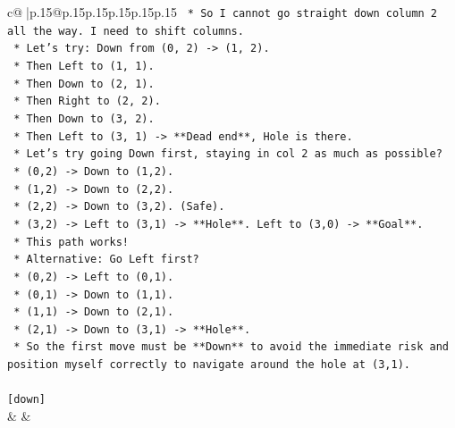 \documentclass{article}
\begin{document}
{\begin{supertabular}{c@{$\;$}|p{.15\linewidth}@{}p{.15\linewidth}p{.15\linewidth}p{.15\linewidth}p{.15\linewidth}p{.15\linewidth}}
{{{\texttt{    *   So I cannot go straight down column 2 all the way. I need to shift columns.} \\
\texttt{    *   Let's try: Down from (0, 2) {-}> (1, 2).} \\
\texttt{    *   Then Left to (1, 1).} \\
\texttt{    *   Then Down to (2, 1).} \\
\texttt{    *   Then Right to (2, 2).} \\
\texttt{    *   Then Down to (3, 2).} \\
\texttt{    *   Then Left to (3, 1) {-}> **Dead end**, Hole is there.} \\
\texttt{    *   Let's try going Down first, staying in col 2 as much as possible?} \\
\texttt{        *   (0,2) {-}> Down to (1,2).} \\
\texttt{        *   (1,2) {-}> Down to (2,2).} \\
\texttt{        *   (2,2) {-}> Down to (3,2). (Safe).} \\
\texttt{        *   (3,2) {-}> Left to (3,1) {-}> **Hole**. Left to (3,0) {-}> **Goal**.} \\
\texttt{    *   This path works!} \\
\texttt{    *   Alternative: Go Left first?} \\
\texttt{        *   (0,2) {-}> Left to (0,1).} \\
\texttt{        *   (0,1) {-}> Down to (1,1).} \\
\texttt{        *   (1,1) {-}> Down to (2,1).} \\
\texttt{        *   (2,1) {-}> Down to (3,1) {-}> **Hole**.} \\
\texttt{    *   So the first move must be **Down** to avoid the immediate risk and position myself correctly to navigate around the hole at (3,1).} \\
\\ 
\texttt{{[}down{]}} \\
            }
        }
    }
    & & \\ \\


\end{supertabular}}
\end{document}
